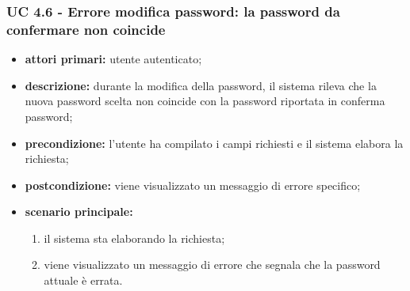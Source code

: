 			\subsubsection{UC 4.6 - Errore modifica password: la password da confermare non coincide}
			\begin{itemize}
				\item \textbf{attori primari:} utente autenticato;
				\item \textbf{descrizione:} durante la modifica della password, il sistema rileva che la nuova password scelta non coincide con la password riportata in conferma password;
				\item \textbf{precondizione:} l'utente ha compilato i campi richiesti e il sistema elabora la richiesta;
				\item \textbf{postcondizione:} viene visualizzato un messaggio di errore specifico;
				\item \textbf{scenario principale:}
				\begin{enumerate}
					\item il sistema sta elaborando la richiesta;
					\item viene visualizzato un messaggio di errore che segnala che la password attuale è errata.
				\end{enumerate}
			\end{itemize}
